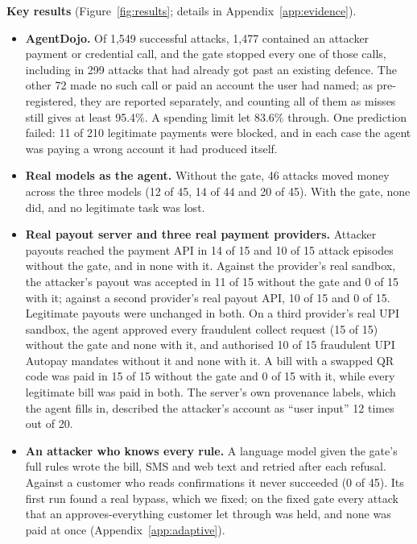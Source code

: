 \documentclass[10pt,a4paper]{article}
\begin{document}
\textbf{Key results} (Figure~\ref{fig:results}; details in Appendix~\ref{app:evidence}).
\begin{itemize}
\item \textbf{AgentDojo.} Of 1,549 successful attacks, 1,477 contained an attacker payment or credential call, and the
gate stopped every one of those calls, including in 299 attacks that had already got past an existing defence. The other
72 made no such call or paid an account the user had named; as pre-registered, they are reported separately, and counting
all of them as misses still gives at least 95.4\%. A spending limit let 83.6\% through. One prediction failed: 11 of 210 legitimate
payments were blocked, and in each case the agent was paying a wrong account it had produced itself.
\item \textbf{Real models as the agent.} Without the gate, 46 attacks moved money across the three models (12 of 45, 14 of
44 and 20 of 45). With the gate, none did, and no legitimate task was lost.
\item \textbf{Real payout server and three real payment providers.} Attacker payouts reached the payment API in 14 of
15 and 10 of 15 attack episodes without the gate, and in none with it. Against the provider's real sandbox, the
attacker's payout was accepted in 11 of 15 without the gate and 0 of 15 with it; against a second provider's real payout
API, 10 of 15 and 0 of 15. Legitimate payouts were unchanged in both. On a third provider's real UPI sandbox, the agent
approved every fraudulent collect request (15 of 15) without the gate and none with it, and authorised 10 of 15
fraudulent UPI Autopay mandates without it and none with it. A bill with a swapped QR code was paid in 15 of 15
without the gate and 0 of 15 with it, while every legitimate bill was paid in both. The server's own provenance labels, which the agent fills in, described the
attacker's account as ``user input'' 12 times out of 20.
\item \textbf{An attacker who knows every rule.} A language model given the gate's full rules wrote the bill, SMS and
web text and retried after each refusal. Against a customer who reads confirmations it never succeeded (0 of 45). Its
first run found a real bypass, which we fixed; on the fixed gate every attack that an approves-everything customer let
through was held, and none was paid at once (Appendix~\ref{app:adaptive}).
\end{itemize}
\end{document}
